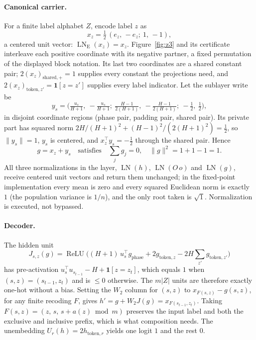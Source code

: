 \documentclass[10pt]{article}
\theoremstyle{remark}
\newcommand{\LN}{\operatorname{LN}}
\newcommand{\relu}{\operatorname{ReLU}}
\begin{document}
\paragraph{Canonical carrier.} For a finite label alphabet $Z$, encode label $z$ as
\[
x_z=\tfrac12\,(e_z,\,-e_z;\ 1,\,-1),
\]
a centered unit vector: $\LN_{\mathrm E}(x_z)=x_z$. Figure~\ref{fig:z3}
and its certificate interleave each positive coordinate with its negative
partner, a fixed permutation of the displayed block notation. Its last two coordinates are a shared constant pair; $2(x_z)_{\mathrm{shared},+}=1$ supplies every constant the projections need, and $2(x_z)_{\mathrm{token},z'}=\mathbf 1[z=z']$ supplies every label indicator. Let the sublayer write be
\[
y_s=\Big(\tfrac{u_s}{H+1},\ -\tfrac{u_s}{H+1};\ \tfrac{H-1}{2(H+1)},\ -\tfrac{H-1}{2(H+1)};\ -\tfrac12,\ \tfrac12\Big),
\]
in disjoint coordinate regions (phase pair, padding pair, shared pair). Its private part has squared norm $2H/(H+1)^2+(H-1)^2/(2(H+1)^2)=\tfrac12$, so $\|y_s\|=1$, $y_s$ is centered, and $x_z^\top y_s=-\tfrac12$ through the shared pair. Hence
\[
g=x_z+y_s \quad\text{satisfies}\quad \textstyle\sum_jg_j=0,\quad \|g\|^2=1+1-1=1 .
\]
All three normalizations in the layer, $\LN(h)$, $\LN(O\,o)$ and $\LN(g)$, receive centered unit vectors and return them unchanged; in the fixed-point implementation every mean is zero and every squared Euclidean norm is exactly $1$
(the population variance is $1/n$), and the only root taken is $\sqrt{1}$. Normalization is executed, not bypassed.

\paragraph{Decoder.} The hidden unit
\[
J_{s,z}(g)=\relu\Big((H+1)\,u_s^\top g_{\mathrm{phase}}+2g_{\mathrm{token},z}-2H\textstyle\sum_{z'}g_{\mathrm{token},z'}\Big)
\]
has pre-activation $u_s^\top u_{s_{t-1}}-H+\mathbf 1[z=z_t]$, which equals $1$ when $(s,z)=(s_{t-1},z_t)$ and is $\le0$ otherwise. The $m|Z|$ units are therefore exactly one-hot without a bias. Setting the $W_2$ column for $(s,z)$ to $x_{F(s,z)}-g(s,z)$, for any finite recoding $F$, gives $h'=g+W_2J(g)=x_{F(s_{t-1},z_t)}$. Taking $F(s,z)=(z,\,s,\,s+a(z)\bmod m)$ preserves the input label and both the exclusive and inclusive prefix, which is what composition needs. The unembedding $U_r(h)=2h_{\mathrm{token},r}$ yields one logit $1$ and the rest $0$.
\end{document}
